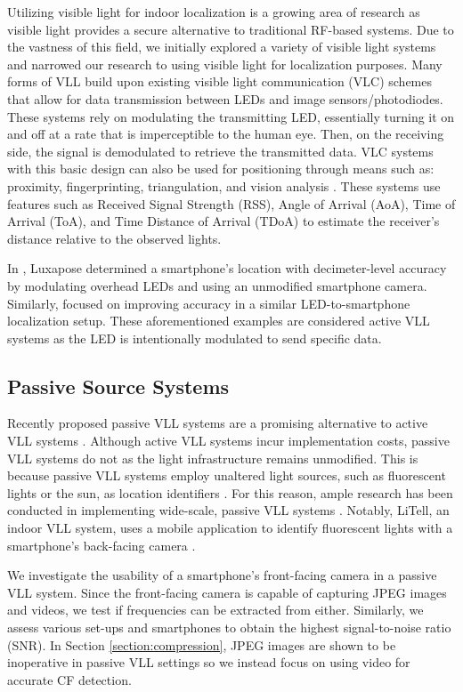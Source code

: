\documentclass[conference]{IEEEtran}
\begin{document}
Utilizing visible light for indoor localization is a growing area of research as visible light provides a secure alternative to traditional RF-based systems. Due to the vastness of this field, we initially explored a variety of visible light systems and narrowed our research to using visible light for localization purposes. Many forms of VLL build upon existing visible light communication (VLC) schemes that allow for data transmission between LEDs and image sensors/photodiodes. These systems rely on modulating the transmitting LED, essentially turning it on and off at a rate that is imperceptible to the human eye. Then, on the receiving side, the signal is demodulated to retrieve the transmitted data. VLC systems with this basic design can also be used for positioning through means such as: proximity, fingerprinting, triangulation, and vision analysis \cite{do2016depth}. These systems use features such as Received Signal Strength (RSS), Angle of Arrival (AoA), Time of Arrival (ToA), and Time Distance of Arrival (TDoA) to estimate the receiver's distance relative to the observed lights. 

In \cite{kuo2014luxapose}, Luxapose determined a smartphone's location with decimeter-level accuracy by modulating overhead LEDs and using an unmodified smartphone camera. Similarly, \cite{li2014epsilon} focused on improving accuracy in a similar LED-to-smartphone localization setup. These aforementioned examples are considered active VLL systems as the LED is intentionally modulated to send specific data.

\subsection{Passive Source Systems}

Recently proposed passive VLL systems are a promising alternative to active VLL systems \cite{wang2017passive}. Although active VLL systems incur implementation costs, passive VLL systems do not as the light infrastructure remains unmodified. This is because passive VLL systems employ unaltered light sources, such as fluorescent lights or the sun, as location identifiers \cite{wang2017passive}.  For this reason, ample research has been conducted in implementing wide-scale, passive VLL systems \cite{zhang2016litell}\cite{wang2016passive}. Notably, LiTell, an indoor VLL system, uses a mobile application to identify fluorescent lights with a smartphone's back-facing camera \cite{zhang2016litell}.

We investigate the usability of a smartphone's front-facing camera in a passive VLL system. Since the front-facing camera is capable of capturing JPEG images and videos, we test if frequencies can be extracted from either. Similarly, we assess various set-ups and smartphones to obtain the highest signal-to-noise ratio (SNR). In Section \ref{section:compression}, JPEG images are shown to be inoperative in passive VLL settings so we instead focus on using video for accurate CF detection.
\end{document}
